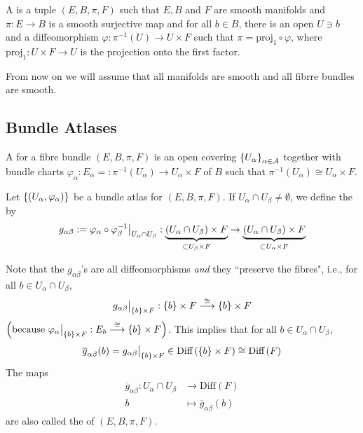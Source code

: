 \documentclass[main.tex]{subfiles}
\begin{document}
\begin{defn}
A  is a tuple $(E, B, \pi, F)$ such that $E, B$ and $F$ are smooth manifolds and $\pi: E \to B$ is a smooth surjective map and for all $b \in B$, there is an open $U \ni b$ and a diffeomorphism $\varphi: \pi^{-1}(U) \to U \times F$ such that $\pi = \text{proj}_1 \circ \varphi$, where $\text{proj}_1 : U \times F \to U$ is the projection onto the first factor.
\end{defn}

\begin{note}
From now on we will assume that all manifolds are smooth and all fibrre bundles are smooth.
\end{note}

\subsection{Bundle Atlases}

\begin{defn}
A  for a fibre bundle $(E, B, \pi, F)$ is an open covering $\left\{ U_\alpha\right\}_{\alpha \in \mathcal{A}}$ together with bundle charts $\varphi_\alpha:  E_\alpha =: \pi^{-1}(U_\alpha) \to U_\alpha \times F$ of $B$ such that $\pi^{-1}(U_\alpha) \cong U_\alpha \times F$.
\end{defn}

\begin{defn}
Let $\left\{ \left( U_\alpha, \varphi_\alpha \right) \right\}$ be a bundle atlas for $(E, B, \pi, F)$. If $U_\alpha \cap U_\beta \neq \emptyset$, we define the  by
\[
g_{\alpha\beta} := \varphi_\alpha \circ \varphi_\beta^{-1}\big|_{U_\alpha \cap U_\beta} : \underbrace{(U_\alpha \cap U_\beta) \times F}_{\subset U_\beta \times F} \to \underbrace{(U_\alpha \cap U_\beta) \times F}_{\subset U_\alpha \times F}
\]

\end{defn}

Note that the $g_{\alpha\beta}$'s are all diffeomorphisms {\it and} they ``preserve the fibres", i.e., for all $b \in U_\alpha \cap U_\beta$,
\[
g_{\alpha\beta}\big|_{\left\{b\right\}\times F}: \left\{b\right\}\times F \overset{\cong}{\longrightarrow} \left\{b\right\}\times F
\]
$\left(  \text{because } \varphi_\alpha \big|_{\left\{b\right\}\times F }: E_b \overset{\cong}{\longrightarrow}\left\{b\right\} \times F \right)$. This implies that for all $b \in U_\alpha \cap U_\beta$,
\[
\overline{g}_{\alpha\beta}(b) = g_{\alpha\beta}\big|_{\left\{b\right\}\times F} \in \text{Diff}\left( \left\{b\right\}\times F \right) \cong \text{Diff}\left(  F \right)
\]
The maps
\begin{align*}
    \overline{g}_{\alpha\beta} : U_\alpha \cap U_\beta &\to \text{Diff}(F) \\
                    b &\mapsto \overline{g}_{\alpha\beta}(b)
\end{align*}
are also called the  of $(E,B,\pi, F)$.
\end{document}
